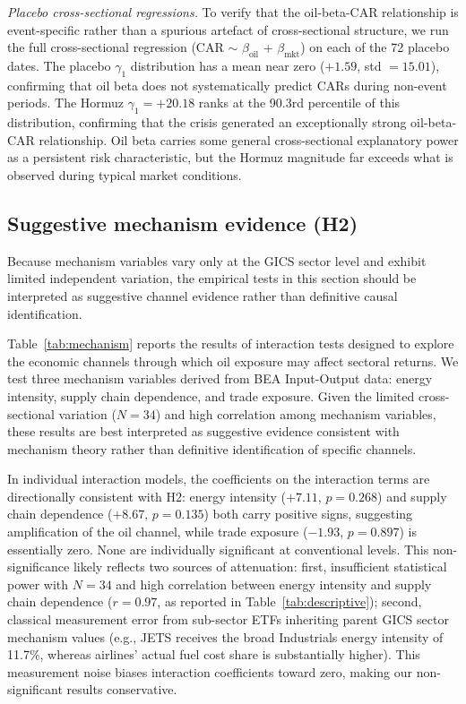 \documentclass[12pt,preprint,authoryear]{elsarticle}
\begin{document}
\textit{Placebo cross-sectional regressions.} To verify that the oil-beta-CAR relationship is event-specific rather than a spurious artefact of cross-sectional structure, we run the full cross-sectional regression (CAR $\sim$ $\beta_{\text{oil}}$ + $\beta_{\text{mkt}}$) on each of the 72 placebo dates. The placebo $\gamma_1$ distribution has a mean near zero ($+1.59$, std $= 15.01$), confirming that oil beta does not systematically predict CARs during non-event periods. The Hormuz $\gamma_1 = +20.18$ ranks at the 90.3rd percentile of this distribution, confirming that the crisis generated an exceptionally strong oil-beta-CAR relationship. Oil beta carries some general cross-sectional explanatory power as a persistent risk characteristic, but the Hormuz magnitude far exceeds what is observed during typical market conditions.

\subsection{Suggestive mechanism evidence (H2)}
Because mechanism variables vary only at the GICS sector level and exhibit limited independent variation, the empirical tests in this section should be interpreted as suggestive channel evidence rather than definitive causal identification.

Table~\ref{tab:mechanism} reports the results of interaction tests designed to explore the economic channels through which oil exposure may affect sectoral returns. We test three mechanism variables derived from BEA Input-Output data: energy intensity, supply chain dependence, and trade exposure. Given the limited cross-sectional variation ($N = 34$) and high correlation among mechanism variables, these results are best interpreted as suggestive evidence consistent with mechanism theory rather than definitive identification of specific channels.

In individual interaction models, the coefficients on the interaction terms are directionally consistent with H2: energy intensity ($+7.11$, $p = 0.268$) and supply chain dependence ($+8.67$, $p = 0.135$) both carry positive signs, suggesting amplification of the oil channel, while trade exposure ($-1.93$, $p = 0.897$) is essentially zero. None are individually significant at conventional levels. This non-significance likely reflects two sources of attenuation: first, insufficient statistical power with $N = 34$ and high correlation between energy intensity and supply chain dependence ($r = 0.97$, as reported in Table~\ref{tab:descriptive}); second, classical measurement error from sub-sector ETFs inheriting parent GICS sector mechanism values (e.g., JETS receives the broad Industrials energy intensity of 11.7\%, whereas airlines' actual fuel cost share is substantially higher). This measurement noise biases interaction coefficients toward zero, making our non-significant results conservative.
\end{document}
